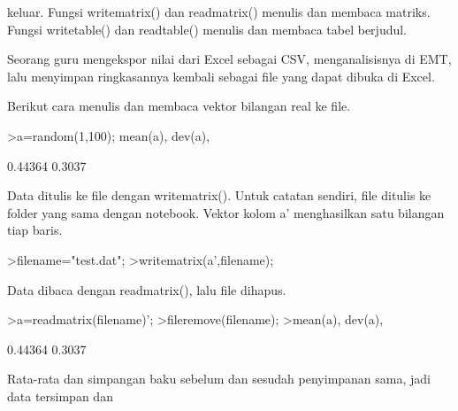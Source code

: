 \documentclass[a4paper,10pt]{article}
\begin{document}
\begin{eulernotebook}
\begin{eulercomment}
\begin{eulercomment}
\begin{eulercomment}
\begin{eulercomment}
\begin{eulercomment}
\begin{eulercomment}
\begin{eulercomment}
\begin{eulercomment}
\begin{eulercomment}
\begin{eulercomment}
\begin{eulercomment}
\begin{eulercomment}
\begin{eulercomment}
\begin{eulercomment}
\begin{eulercomment}
\begin{eulercomment}
\begin{eulercomment}
\begin{eulercomment}
\begin{eulercomment}
\begin{eulercomment}
\begin{eulercomment}
\begin{eulercomment}
\begin{eulercomment}
\begin{eulercomment}
\begin{eulercomment}
\begin{eulercomment}
\begin{eulercomment}
keluar. Fungsi writematrix() dan readmatrix() menulis dan membaca matriks. Fungsi
writetable() dan readtable() menulis dan membaca tabel berjudul.

\end{eulercomment}
\begin{eulercomment}
Seorang guru mengekspor nilai dari Excel sebagai CSV, menganalisisnya di EMT, lalu menyimpan
ringkasannya kembali sebagai file yang dapat dibuka di Excel.

\end{eulercomment}
\begin{eulercomment}
Berikut cara menulis dan membaca vektor bilangan real ke file.
\end{eulercomment}
\begin{eulerprompt}
>a=random(1,100); mean(a), dev(a),
\end{eulerprompt}
\begin{euleroutput}
  0.44364
  0.3037
\end{euleroutput}
\begin{eulercomment}
Data ditulis ke file dengan writematrix(). Untuk catatan sendiri, file ditulis ke folder
yang sama dengan notebook. Vektor kolom a' menghasilkan satu bilangan tiap baris.
\end{eulercomment}
\begin{eulerprompt}
>filename="test.dat";
>writematrix(a',filename);
\end{eulerprompt}
\begin{eulercomment}
Data dibaca dengan readmatrix(), lalu file dihapus.
\end{eulercomment}
\begin{eulerprompt}
>a=readmatrix(filename)';
>fileremove(filename);
>mean(a), dev(a),
\end{eulerprompt}
\begin{euleroutput}
  0.44364
  0.3037
\end{euleroutput}
\begin{eulercomment}
Rata-rata dan simpangan baku sebelum dan sesudah penyimpanan sama, jadi data tersimpan dan

\end{eulercomment}
\end{eulercomment}
\end{eulercomment}
\end{eulercomment}
\end{eulercomment}
\end{eulercomment}
\end{eulercomment}
\end{eulercomment}
\end{eulercomment}
\end{eulercomment}
\end{eulercomment}
\end{eulercomment}
\end{eulercomment}
\end{eulercomment}
\end{eulercomment}
\end{eulercomment}
\end{eulercomment}
\end{eulercomment}
\end{eulercomment}
\end{eulercomment}
\end{eulercomment}
\end{eulercomment}
\end{eulercomment}
\end{eulercomment}
\end{eulercomment}
\end{eulercomment}
\end{eulercomment}
\end{eulernotebook}
\end{document}
